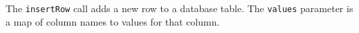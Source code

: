 The \verb+insertRow+ call adds a new row to a database table. The \verb+values+ parameter is a map
of column names to values for that column.
